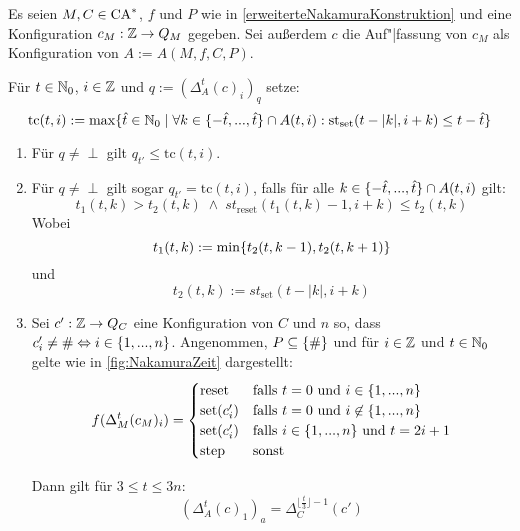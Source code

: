 \begin{satz}
    \label{timeNakamuraConstruction}
    Es seien $M, C \in \textrm{CA}^*$, $f$ und $P$ wie in \cref{erweiterteNakamuraKonstruktion} und eine Konfiguration $c_M: \mathbb{Z} \to Q_M$ gegeben.
    Sei außerdem $c$ die Auf"|fassung von $c_M$ als Konfiguration von $A := A(M, f, C, P)$.
    
    Für $t \in \mathbb{N}_0$, $i \in \mathbb{Z}$ und $q := (\Delta_{A}^t(c)_i)_q$ setze:
    \[
        \mathrm{tc}(t, i) := \max \{ { \hat{t} \in \mathbb{N}_0} \; | \; {
                \forall k \in \{ {-\hat{t}, ..., \hat{t} } \} \cap A(t, i):
                \mathrm{st}_{\mathrm{set}}(t-|k|, i+k) \leq t - \hat{t}
            } \}
    \]
    \begin{enumerate}
        \item \label{timeNakamuraConstruction_1}
            Für $q \neq \perp$ gilt $q_{t'} \leq \mathrm{tc}(t, i)$.
        \item \label{timeNakamuraConstruction_2}
            Für $q \neq \perp$ gilt sogar  $q_{t'} = \mathrm{tc}(t, i)$, falls für alle $k \in \{ {-\hat{t}, ..., \hat{t} } \} \cap A(t, i)$ gilt:
            \[
                t_1(t, k) > t_2(t, k)
                \; \land \;
                st_{\mathrm{reset}}(t_1(t, k) - 1, i + k) \leq t_2(t, k)
            \]
            Wobei
            \[
                t_1(t, k) := \min \{ { t_2(t, k - 1), t_2(t, k + 1) } \}
            \]
            und
            \[
                t_2(t, k) := st_{\mathrm{set}}(t - |k|, i + k)
            \]
        \item \label{timeNakamuraConstruction_3}
            Sei $c': \mathbb{Z} \to Q_C$ eine Konfiguration von $C$ und $n$ so, dass $c'_i \neq \# \Leftrightarrow i \in \{ { 1, ..., n } \}$.
            Angenommen, $P \subseteq \{ { \# } \} $ und für $i \in \mathbb{Z}$ und $t \in \mathbb{N}_0$ gelte wie in \cref{fig:NakamuraZeit} dargestellt:
            \[
                f(\Delta_M^t(c_M)_i) =
                \begin{cases}
                    \mathrm{reset} & \text{falls } t = 0 \text{ und } i \in \{ {1, ..., n} \} \\
                    \mathrm{set}(c'_i) & \text{falls } t = 0 \text{ und } i \not\in \{ {1, ..., n} \} \\
                    \mathrm{set}(c'_i) & \text{falls } i \in \{ {1, ..., n} \} \text{ und } t = 2i + 1 \\
                    \mathrm{step} & \text{sonst}
                \end{cases}
            \]
            
            Dann gilt für $3 \leq t \leq 3n$:
            \[
                (\Delta^{t}_A(c)_1)_a = \Delta^{\lfloor \frac{t}{3} \rfloor - 1}_C(c')
            \]
     \end{enumerate}
\end{satz}
